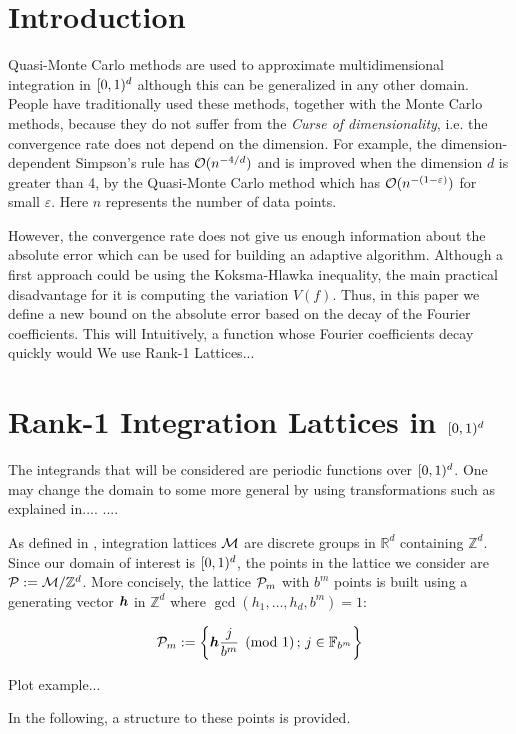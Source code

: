 \documentclass[graybox,footinfo]{svmult}
\newcommand{\Z}{\mathbb{Z}} %
\newcommand{\R}{\mathbb{R}} %
\newcommand{\F}{\mathbb{F}} %
\begin{document}
\section{Introduction}
Quasi-Monte Carlo methods are used to approximate multidimensional integration in $[0,1)^d$ although this can be generalized in any other domain. People have traditionally used these methods, together with the Monte Carlo methods, because they do not suffer from the \textit{Curse of dimensionality}, i.e. the convergence rate does not depend on the dimension. For example, the dimension-dependent Simpson's rule has $\mathcal{O}(n^{-4/d})$ and is improved when the dimension $d$ is greater than 4, by the Quasi-Monte Carlo method which has $\mathcal{O}(n^{-(1-\varepsilon)})$ for small $\varepsilon$. Here $n$ represents the number of data points.

However, the convergence rate does not give us enough information about the absolute error which can be used for building an adaptive algorithm. Although a first approach could be using the Koksma-Hlawka inequality, the main practical disadvantage for it is computing the variation $V(f)$. Thus, in this paper we define a new bound on the absolute error based on the decay of the Fourier coefficients. This will 
Intuitively, a function whose Fourier coefficients decay quickly would 
We use Rank-1 Lattices...

\section{Rank-1 Integration Lattices in $[0,1)^d$}
The integrands that will be considered are periodic functions over $[0,1)^d$. One may change the domain to some more general by using transformations such as explained in.... ....

As defined in \cite{SloJoe94}, integration lattices $\mathcal{M}$ are discrete groups in $\R^d$ containing $\Z^d$. Since our domain of interest is $[0,1)^d$, the points in the lattice we consider are $\cp:=\cm/\Z^d$. More concisely, the lattice $\mathcal{P}_m$ with $b^m$ points is built using a generating vector $\boldsymbol{h}$ in $\Z^d$ where $\gcd(h_1,\dots,h_d,b^m)=1$:

\begin{equation}
\cp_m :=\left\{\bsh\frac{j}{b^m}\pmod 1\, ;\, j\in\F_{b^m}\right\}
\end{equation}

Plot example...

In the following, a structure to these points is provided.
\end{document}
